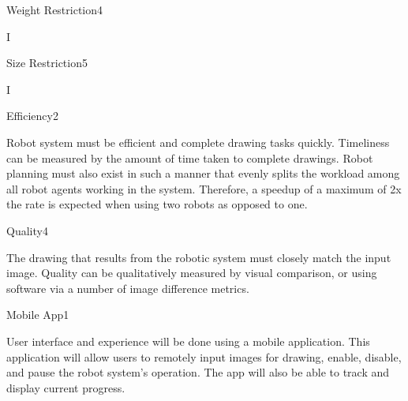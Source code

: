 {

\begin{nonfunctional_requirement}{Weight Restriction}{4}
\label{nfr:weight_limit}
\item I
\end{nonfunctional_requirement}

\begin{nonfunctional_requirement}{Size Restriction}{5}
\label{nfr:size_limit}
\item I
\end{nonfunctional_requirement}

\begin{nonfunctional_requirement}{Efficiency}{2}
\item Robot system must be efficient and complete drawing tasks quickly. Timeliness can be measured by the amount of time taken to complete drawings. Robot planning must also exist in such a manner that evenly splits the workload among all robot agents working in the system. Therefore, a speedup of a maximum of 2x the rate is expected when using two robots as opposed to one. 
\end{nonfunctional_requirement}

\begin{nonfunctional_requirement}{Quality}{4}
\item The drawing that results from the robotic system must closely match the input image. Quality can be qualitatively measured by visual comparison, or using software via a number of image difference metrics.
\end{nonfunctional_requirement}

\begin{nonfunctional_requirement}{Mobile App}{1}
\item User interface and experience will be done using a mobile application. This application will allow users to remotely input images for drawing, enable, disable, and pause the robot system's operation. The app will also be able to track and display current progress.
\end{nonfunctional_requirement}

}
